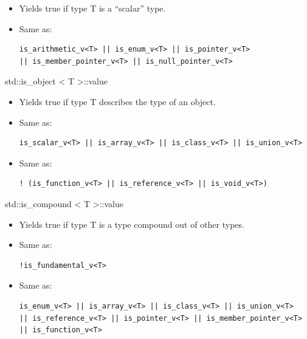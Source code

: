 \begin{itemize}
\item 
Yields true if type T is a “scalar” type.

\item 
Same as: 
\begin{lstlisting}[style=styleCXX]
is_arithmetic_v<T> || is_enum_v<T> || is_pointer_v<T>
|| is_member_pointer_v<T> || is_null_pointer_v<T>
\end{lstlisting}
\end{itemize}

std::is\_object < T >::value

\begin{itemize}
\item 
Yields true if type T describes the type of an object.

\item 
Same as: 
\begin{lstlisting}[style=styleCXX]
is_scalar_v<T> || is_array_v<T> || is_class_v<T> || is_union_v<T>
\end{lstlisting}

\item
Same as: 
\begin{lstlisting}[style=styleCXX]
! (is_function_v<T> || is_reference_v<T> || is_void_v<T>)
\end{lstlisting}
\end{itemize}


std::is\_compound < T >::value

\begin{itemize}
\item 
Yields true if type T is a type compound out of other types.

\item 
Same as: 
\begin{lstlisting}[style=styleCXX]
!is_fundamental_v<T>
\end{lstlisting}

\item
Same as: 
\begin{lstlisting}[style=styleCXX]
is_enum_v<T> || is_array_v<T> || is_class_v<T> || is_union_v<T>
|| is_reference_v<T> || is_pointer_v<T> || is_member_pointer_v<T>
|| is_function_v<T>
\end{lstlisting}
\end{itemize}



